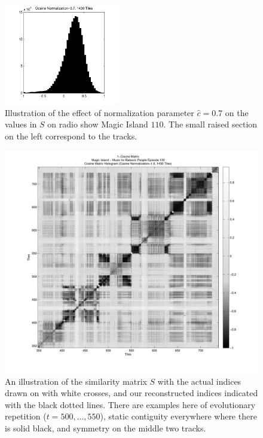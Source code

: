 \documentclass[twocolumn]{article}
\begin{document}
		\begin{figure}
			\centering
			\includegraphics[width=0.45\textwidth]{images/cosinesmagic110}
			
			\caption{Illustration of the effect of normalization parameter $\hat c=0.7$ on the values in $S$ on radio show Magic Island $110$. The small raised section on the left correspond to the tracks.}
			\label{fig:cosine_norm}
		\end{figure} 
	
	\begin{figure}[t]
		\centering
		\includegraphics[width=1.08\textwidth]{images/S}
		\caption{An illustration of the similarity matrix $S$ with the actual indices drawn on with white crosses, and our reconstructed indices indicated with the black dotted lines. There are examples here of evolutionary repetition ($t=500,\ldots,550$), static contiguity everywhere where there is solid black, and symmetry on the middle two tracks.}
		\label{fig:simmatrix}
	\end{figure} 
	
\end{document}
